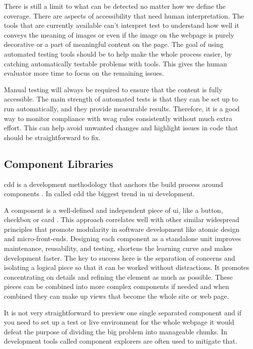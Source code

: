 \documentclass{master_thesis}
\begin{document}
There is still a limit to what can be detected no matter how we define the coverage. There are aspects of accessibility that need human interpretation. The tools that are currently available can't interpret test to understand how well it conveys the meaning of images or even if the image on the webpage is purely decorative or a part of meaningful content on the page. The goal of using automated testing tools should be to help make the whole process easier, by catching automatically testable problems with tools. This gives the human evaluator more time to focus on the remaining issues.

Manual testing will always be required to ensure that the content is fully accessible. The main strength of automated tests is that they can be set up to run automatically, and they provide measurable results. Therefore, it is a good way to monitor compliance with \ac{wcag} rules consistently without much extra effort. This can help avoid unwanted changes and highlight issues in code that should be straightforward to fix.

\subsection{Component Libraries}


\ac{cdd} is a development methodology that anchors the build process around components \citep{Coleman2017}. In \citeyear{Coleman2017} \citeauthor{Coleman2017} called \ac{cdd} the biggest trend in \ac{ui} development.

A component is a well-defined and independent piece of \ac{ui}, like a button, checkbox or card \citep{Ella2019}. This approach correlates well with other similar widespread principles that promote modularity in software development like atomic design and micro-front-ends. Designing each component as a standalone unit improves maintenance, reusability, and testing, shortens the learning curve and makes development faster. The key to success here is the separation of concerns and isolating a logical piece so that it can be worked without distractions. It promotes concentrating on details and refining the element as much as possible. These pieces can be combined into more complex components if needed and when combined they can make up views that become the whole site or web page.

It is not very straightforward to preview one single separated component and if you need to set up a test or live environment for the whole webpage it would defeat the purpose of dividing the big problem into manageable chunks. In development tools called component explorers are often used to mitigate that.
\end{document}

